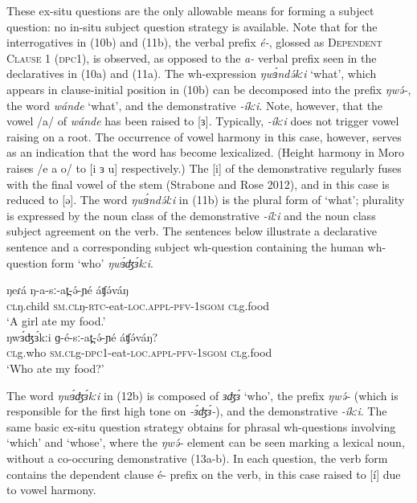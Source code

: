 These ex-situ questions are the only allowable means for forming a subject question: no in-situ subject question strategy is available. Note that for the interrogatives in (10b) and (11b), the verbal prefix \textit{é-}, glossed as \textsc{Dependent Clause} 1 (\textsc{dpc}1), is observed, as opposed to the \textit{a-} verbal prefix seen in the declaratives in (10a) and (11a). The wh-expression \textit{ŋwɜ́ndə́kːi} ‘what’, which appears in clause-initial position in (10b) can be decomposed into the prefix \textit{ŋwə́-}, the word \textit{wánde} ‘what’, and the demonstrative \textit{-íkːi}. Note, however, that the vowel /a/ of \textit{wánde} has been raised to [ɜ]. Typically, \textit{-íkːi} does not trigger vowel raising on a root. The occurrence of vowel harmony in this case, however, serves as an indication that the word has become lexicalized. (Height harmony in Moro raises /e a o/ to [i ɜ u] respectively.) The [i] of the demonstrative regularly fuses with the final vowel of the stem (Strabone and Rose 2012), and in this case is reduced to [ə]. The word \textit{ŋwɜ́ndə́lːi} in (11b) is the plural form of ‘what’; plurality is expressed by the noun class of the demonstrative \textit{-ílːi} and the noun class subject agreement on the verb.
The sentences below illustrate a declarative sentence and a corresponding subject wh-question containing the human wh-question form ‘who’ \textit{ŋwɜ́ʤɜ́kːi}. 

\ea
\ea \gll	ŋeɾá       	ŋ-a-sː-at̪-ə́-ɲé	áʧə́váŋ	\\
\textsc{cl}ŋ.child	\textsc{sm.cl}ŋ-\textsc{rtc}-eat-\textsc{loc}.\textsc{appl}-\textsc{pfv}-1\textsc{sgom}	\textsc{cl}g.food  \\
\trans ‘A girl ate my food.’\\
\ex \gll	ŋwɜ́ʤɜ́kːi   ɡ-é-sː-at̪-ə́-ɲé	áʧə́váŋ?	\\
\textsc{cl}g.who	\textsc{sm.cl}g-\textsc{dpc}1-eat-\textsc{loc}.\textsc{appl}-\textsc{pfv}-1\textsc{sgom}	\textsc{cl}g.food  \\
\trans ‘Who ate my food?’\\
\z
\z

The word \textit{ŋwɜ́ʤɜ́kːi} in (12b) is composed of \textit{ɜʤɜ́} ‘who’, the prefix \textit{ŋwə́-} (which is responsible for the first high tone on \textit{-ɜ́ʤɜ́-}), and the demonstrative \textit{-íkːi}. 
The same basic ex-situ question strategy obtains for phrasal wh-questions involving ‘which’ and ‘whose’, where the \textit{ŋwə́-} element can be seen marking a lexical noun, without a co-occuring demonstrative (13a-b). In each question, the verb form contains the dependent clause é- prefix on the verb, in this case raised to [í] due to vowel harmony. 

